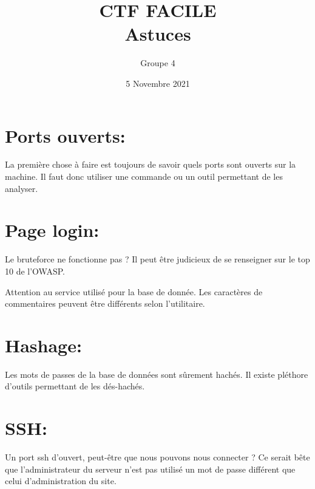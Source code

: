 \documentclass{article}
\title{\textbf{CTF FACILE}\\ \textbf{Astuces}}
\author{Groupe 4}
\date{5 Novembre 2021}
\begin{document}
\maketitle

\section*{Ports ouverts:}

La première chose à faire est toujours de savoir quels ports sont ouverts sur la machine. Il faut donc utiliser une commande ou un outil permettant de les analyser.

\section*{Page login:}

Le bruteforce ne fonctionne pas ? Il peut être judicieux de se renseigner sur le top 10 de l'OWASP.\newline

Attention au service utilisé pour la base de donnée. Les caractères de commentaires peuvent être différents selon l'utilitaire.

\section*{Hashage:}

Les mots de passes de la base de données sont sûrement hachés. Il existe pléthore d'outils permettant de les dés-hachés.

\section*{SSH:}

Un port ssh d'ouvert, peut-être que nous pouvons nous connecter ? Ce serait bête que l'administrateur du serveur n'est pas utilisé un mot de passe différent que celui d'administration du site.
\end{document}

